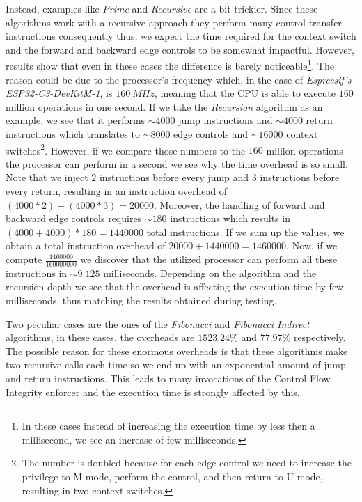 Instead, examples like \textit{Prime} and \textit{Recursive} are a bit trickier.
Since these algorithms work with a recursive approach they perform many control
transfer instructions consequently thus, we expect the time required for the context
switch and the forward and backward edge controls to be somewhat impactful.
However, results show that even in these cases the difference is barely noticeable\footnote{In
these cases instead of increasing the execution time by less then a millisecond,
we see an increase of few milliseconds.}. The reason could be due to the processor's
frequency which, in the case of \textit{Espressif's ESP32-C3-DevKitM-1}, is
$160 \ MHz$, meaning that the CPU is able to execute $160$ million operations in
one second. If we take the \textit{Recursion} algorithm as an example, we see
that it performs $\sim 4000$ jump instructions and $\sim 4000$ return
instructions which translates to $\sim 8000$ edge controls and $\sim 16000$
context switches\footnote{The number is doubled because for each edge control we
need to increase the privilege to M-mode, perform the control, and then return
to U-mode, resulting in two context switches.}. However, if we compare those numbers
to the $160$ million operations the processor can perform in a second we see why
the time overhead is so small. Note that we inject $2$ instructions before every
jump and $3$ instructions before every return, resulting in an instruction overhead
of $(4000*2) + (4000*3) = 20000$. Moreover, the handling of forward and backward
edge controls requires $\sim 180$ instructions which results in $(4000 + 4000) *
180 = 1440000$ total instructions. If we sum up the values, we obtain a total instruction
overhead of $20000 + 1440000 = 1460000$. Now, if we compute $\frac{1460000}{160000000}$
we discover that the utilized processor can perform all these instructions in $\sim
9.125$ milliseconds. Depending on the algorithm and the recursion depth we see
that the overhead is affecting the execution time by few milliseconds, thus matching
the results obtained during testing.

Two peculiar cases are the ones of the \textit{Fibonacci} and \textit{Fibonacci
Indirect} algorithms, in these cases, the overheads are $1523.24\%$ and $77.97\%$
respectively. The possible reason for these enormous overheads is that these
algorithms make two recursive calls each time so we end up with an exponential
amount of jump and return instructions. This leads to many invocations of the Control
Flow Integrity enforcer and the execution time is strongly affected by this.

